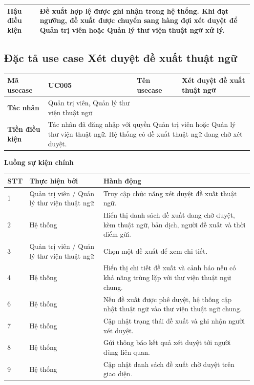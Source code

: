 \documentclass[../DoAn.tex]{subfiles}
\begin{document}
\begin{longtable}{|p{4cm}|p{10.5cm}|}
\hline
\textbf{Hậu điều kiện} & Đề xuất hợp lệ được ghi nhận trong hệ thống. Khi đạt ngưỡng, đề xuất được chuyển sang hàng đợi xét duyệt để Quản trị viên hoặc Quản lý thư viện thuật ngữ xử lý. \\ \hline
\end{longtable}

\subsection{Đặc tả use case Xét duyệt đề xuất thuật ngữ}

\begin{longtable}{|p{3cm}|p{4cm}|p{3cm}|p{4.5cm}|}
\hline
\textbf{Mã usecase} & UC005 & \textbf{Tên usecase} & Xét duyệt đề xuất thuật ngữ \\ \hline
\textbf{Tác nhân} & Quản trị viên, Quản lý thư viện thuật ngữ & & \\ \hline
\textbf{Tiền điều kiện} & \multicolumn{3}{p{11.5cm}|}{Tác nhân đã đăng nhập với quyền Quản trị viên hoặc Quản lý thư viện thuật ngữ. Hệ thống có đề xuất thuật ngữ đang chờ xét duyệt.} \\ \hline
\end{longtable}

\textbf{Luồng sự kiện chính}

\begin{longtable}{|p{1cm}|p{3.3cm}|p{10.2cm}|}
\hline
\textbf{STT} & \textbf{Thực hiện bởi} & \textbf{Hành động} \\ \hline
1 & Quản trị viên / Quản lý thư viện thuật ngữ & Truy cập chức năng xét duyệt đề xuất thuật ngữ. \\ \hline
2 & Hệ thống & Hiển thị danh sách đề xuất đang chờ duyệt, kèm thuật ngữ, bản dịch, người đề xuất và thời điểm gửi. \\ \hline
3 & Quản trị viên / Quản lý thư viện thuật ngữ & Chọn một đề xuất để xem chi tiết. \\ \hline
4 & Hệ thống & Hiển thị chi tiết đề xuất và cảnh báo nếu có khả năng trùng lặp với thư viện thuật ngữ chung. \\ \hline
6 & Hệ thống & Nếu đề xuất được phê duyệt, hệ thống cập nhật thuật ngữ vào thư viện thuật ngữ chung. \\ \hline
7 & Hệ thống & Cập nhật trạng thái đề xuất và ghi nhận người xét duyệt. \\ \hline
8 & Hệ thống & Gửi thông báo kết quả xét duyệt tới người dùng liên quan. \\ \hline
9 & Hệ thống & Cập nhật danh sách đề xuất chờ duyệt trên giao diện. \\ \hline
\end{longtable}
\end{document}
